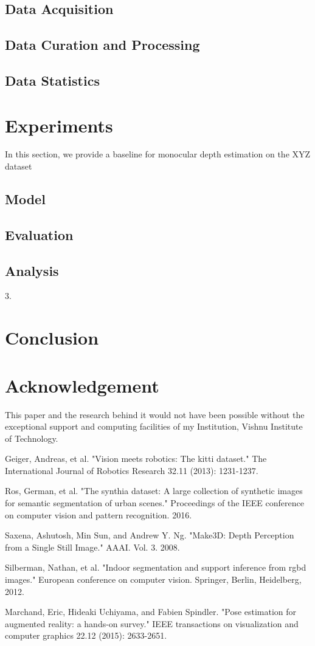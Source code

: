 \documentclass{article}
\begin{document}
\subsection{Data Acquisition}
\subsection{Data Curation and Processing}
\subsection{Data Statistics}


\section{Experiments}
In this section, we provide a baseline for monocular depth estimation on the XYZ dataset
\subsection{Model}
\subsection{Evaluation}
\subsection{Analysis}

3. 
\section{Conclusion}
\section{Acknowledgement}
This paper and the research behind it would not have been possible without the exceptional support and computing facilities of my Institution, Vishnu Institute of Technology.
\begin{thebibliography}{10}
 Geiger, Andreas, et al. "Vision meets robotics: The kitti dataset." The International Journal of Robotics Research 32.11 (2013): 1231-1237.

 Ros, German, et al. "The synthia dataset: A large collection of synthetic images for semantic segmentation of urban scenes." Proceedings of the IEEE conference on computer vision and pattern recognition. 2016.

 Saxena, Ashutosh, Min Sun, and Andrew Y. Ng. "Make3D: Depth Perception from a Single Still Image." AAAI. Vol. 3. 2008.

 Silberman, Nathan, et al. "Indoor segmentation and support inference from rgbd images." European conference on computer vision. Springer, Berlin, Heidelberg, 2012.

 Marchand, Eric, Hideaki Uchiyama, and Fabien Spindler. "Pose estimation for augmented reality: a hands-on survey." IEEE transactions on visualization and computer graphics 22.12 (2015): 2633-2651.

\end{thebibliography}
\end{document}
